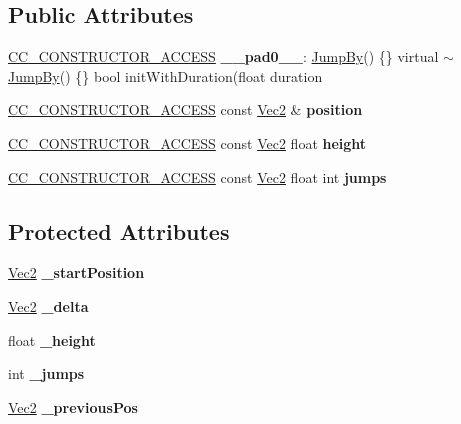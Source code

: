 \subsection*{Public Attributes}
\begin{DoxyCompactItemize}
\item 
\mbox{\label{classJumpBy_a6aa91a38dcd48e1b63a8e24cc3bf73ed}} 
\hyperlink{_2cocos2d_2cocos_2base_2ccConfig_8h_a25ef1314f97c35a2ed3d029b0ead6da0}{C\+C\+\_\+\+C\+O\+N\+S\+T\+R\+U\+C\+T\+O\+R\+\_\+\+A\+C\+C\+E\+SS} {\bfseries \+\_\+\+\_\+pad0\+\_\+\+\_\+}\+: \hyperlink{classJumpBy}{Jump\+By}() \{\} virtual $\sim$\hyperlink{classJumpBy}{Jump\+By}() \{\} bool init\+With\+Duration(float duration
\item 
\mbox{\label{classJumpBy_aad53f288c23c2798ca45a17aafc27697}} 
\hyperlink{_2cocos2d_2cocos_2base_2ccConfig_8h_a25ef1314f97c35a2ed3d029b0ead6da0}{C\+C\+\_\+\+C\+O\+N\+S\+T\+R\+U\+C\+T\+O\+R\+\_\+\+A\+C\+C\+E\+SS} const \hyperlink{classVec2}{Vec2} \& {\bfseries position}
\item 
\mbox{\label{classJumpBy_a0bcffc1a52f03231eef384cc587ca163}} 
\hyperlink{_2cocos2d_2cocos_2base_2ccConfig_8h_a25ef1314f97c35a2ed3d029b0ead6da0}{C\+C\+\_\+\+C\+O\+N\+S\+T\+R\+U\+C\+T\+O\+R\+\_\+\+A\+C\+C\+E\+SS} const \hyperlink{classVec2}{Vec2} float {\bfseries height}
\item 
\mbox{\label{classJumpBy_a9cac3c055a77ddc1c22d8d67ff5b060d}} 
\hyperlink{_2cocos2d_2cocos_2base_2ccConfig_8h_a25ef1314f97c35a2ed3d029b0ead6da0}{C\+C\+\_\+\+C\+O\+N\+S\+T\+R\+U\+C\+T\+O\+R\+\_\+\+A\+C\+C\+E\+SS} const \hyperlink{classVec2}{Vec2} float int {\bfseries jumps}
\end{DoxyCompactItemize}
\subsection*{Protected Attributes}
\begin{DoxyCompactItemize}
\item 
\mbox{\label{classJumpBy_af1435bc819d7104505f5bde3c31ccd1d}} 
\hyperlink{classVec2}{Vec2} {\bfseries \+\_\+start\+Position}
\item 
\mbox{\label{classJumpBy_a0959f4ed7de487d7f9275dbee7dd079c}} 
\hyperlink{classVec2}{Vec2} {\bfseries \+\_\+delta}
\item 
\mbox{\label{classJumpBy_aec9c7880acd7e9503a303db9eceeb40e}} 
float {\bfseries \+\_\+height}
\item 
\mbox{\label{classJumpBy_ae42662b2e20d4d92f1021463f6c00634}} 
int {\bfseries \+\_\+jumps}
\item 
\mbox{\label{classJumpBy_a9f4d79d44a7b4c543cc9e56dac074fe0}} 
\hyperlink{classVec2}{Vec2} {\bfseries \+\_\+previous\+Pos}
\end{DoxyCompactItemize}
